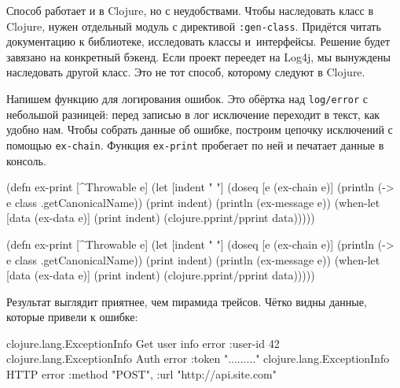 Способ работает и в Clojure, но с неудобствами. Чтобы наследовать класс в
Clojure, нужен отдельный модуль с директивой \verb|:gen-class|. Придётся
читать документацию к библиотеке, исследовать классы и~интерфейсы. Решение будет
завязано на конкретный бэкенд. Если проект переедет на Log4j, мы вынуждены
наследовать другой класс. Это не тот способ, которому следуют в Clojure.

Напишем функцию для логирования ошибок. Это обёртка над \verb|log/error| с
небольшой разницей: перед записью в лог исключение переходит в текст, как удобно
нам. Чтобы собрать данные об ошибке, построим цепочку исключений с помощью
\verb|ex-chain|. Функция \verb|ex-print| пробегает по ней и печатает данные в
консоль.


\ifx\DEVICETYPE\MOBILE

\begin{english}
  \begin{clojure}
(defn ex-print
  [^Throwable e]
  (let [indent "  "]
    (doseq [e (ex-chain e)]
      (println (-> e
                   class
                   .getCanonicalName))
      (print indent)
      (println (ex-message e))
      (when-let [data (ex-data e)]
        (print indent)
        (clojure.pprint/pprint data)))))
  \end{clojure}
\end{english}

\else

\begin{english}
  \begin{clojure}
(defn ex-print
  [^Throwable e]
  (let [indent "  "]
    (doseq [e (ex-chain e)]
      (println (-> e class .getCanonicalName))
      (print indent)
      (println (ex-message e))
      (when-let [data (ex-data e)]
        (print indent)
        (clojure.pprint/pprint data)))))
  \end{clojure}
\end{english}

\fi

Результат выглядит приятнее, чем пирамида трейсов. Чётко видны данные,
которые привели к ошибке:

\ifx\DEVICETYPE\MOBILE

\begin{english}
  \begin{clojure}
clojure.lang.ExceptionInfo
  Get user info error
  {:user-id 42}
clojure.lang.ExceptionInfo
  Auth error
  {:token "........."}
clojure.lang.ExceptionInfo
  HTTP error
  {:method "POST",
   :url "http://api.site.com"}
  \end{clojure}
\end{english}

